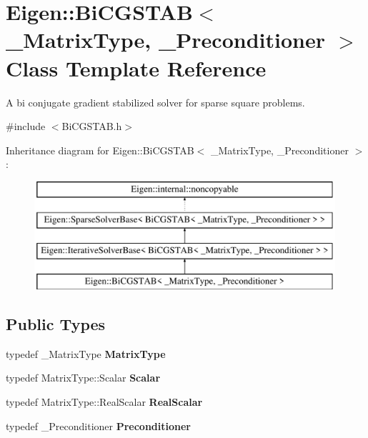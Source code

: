 \hypertarget{class_eigen_1_1_bi_c_g_s_t_a_b}{}\section{Eigen\+::Bi\+C\+G\+S\+T\+AB$<$ \+\_\+\+Matrix\+Type, \+\_\+\+Preconditioner $>$ Class Template Reference}
\label{class_eigen_1_1_bi_c_g_s_t_a_b}


A bi conjugate gradient stabilized solver for sparse square problems.  




{\ttfamily \#include $<$Bi\+C\+G\+S\+T\+A\+B.\+h$>$}

Inheritance diagram for Eigen\+::Bi\+C\+G\+S\+T\+AB$<$ \+\_\+\+Matrix\+Type, \+\_\+\+Preconditioner $>$\+:\begin{figure}[H]
\begin{center}
\leavevmode
\includegraphics[height=4.000000cm]{class_eigen_1_1_bi_c_g_s_t_a_b}
\end{center}
\end{figure}
\subsection*{Public Types}
\begin{DoxyCompactItemize}
\item 
\mbox{\label{class_eigen_1_1_bi_c_g_s_t_a_b_a32fdde20d29016946ae69b4ed5915f22}} 
typedef \+\_\+\+Matrix\+Type {\bfseries Matrix\+Type}
\item 
\mbox{\label{class_eigen_1_1_bi_c_g_s_t_a_b_ac52ea7eaf5cfde0eef5f846e95f49e02}} 
typedef Matrix\+Type\+::\+Scalar {\bfseries Scalar}
\item 
\mbox{\label{class_eigen_1_1_bi_c_g_s_t_a_b_a04cd3a89fc09e4fc6a464ee879caa3db}} 
typedef Matrix\+Type\+::\+Real\+Scalar {\bfseries Real\+Scalar}
\item 
\mbox{\label{class_eigen_1_1_bi_c_g_s_t_a_b_ae530e71021e146c29a47e4d634c279ff}} 
typedef \+\_\+\+Preconditioner {\bfseries Preconditioner}
\end{DoxyCompactItemize}
